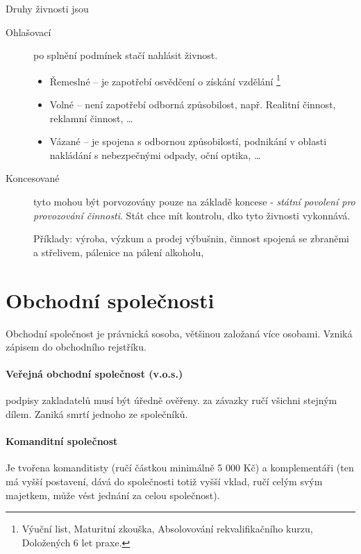 \documentclass[10pt,a4paper,
twoside,%
]{report}
\begin{document}
Druhy živnosti jsou 
\begin{description}
\item[Ohlašovací] po splnění podmínek stačí nahlásit živnost.
\begin{itemize}
\item Řemeslné -- je zapotřebí osvědčení o získání vzdělání \footnote{Výuční list, Maturitní zkouška, Absolovování rekvalifikačního kurzu, Doložených 6 let praxe.}
\item Volné -- není zapotřebí odborná způsobilost, např. \textsf{Realitní činnost, reklamní činnost, \dots}
\item Vázané -- je spojena s odbornou způsobilostí, podnikání v oblasti nakládání s nebezpečnými odpady, oční optika, \dots
\end{itemize}
\item[Koncesované] tyto mohou být porvozovány pouze na základě koncese - \emph{státní povolení pro provozování činnosti}. Stát chce mít kontrolu, dko tyto živnosti vykonnává.

Příklady: výroba, výzkum a prodej výbušnin, činnost spojená se zbraněmi a střelivem, pálenice na pálení alkoholu, 
\end{description}

\section{Obchodní společnosti}

Obchodní společnost je právnická sosoba, většinou založaná více osobami. Vzniká zápisem do obchodního rejstříku.

\paragraph{Veřejná obchodní společnost (v.o.s.)} podpisy zakladatelů musí být úředně ověřeny. za závazky ručí všichni stejným dílem. Zaniká smrtí jednoho ze společníků.

\paragraph{Komanditní společnost} Je tvořena komanditisty (ručí částkou minimálně 5 000 Kč) a komplementáři (ten má vyšší postavení, dává do společnosti totiž vyšší vklad, ručí celým svým majetkem, může vést jednání za celou společnost).
\end{document}
